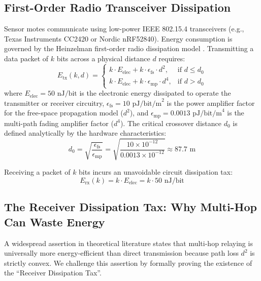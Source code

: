 \documentclass[journal]{IEEEtran}
\begin{document}
\subsection{First-Order Radio Transceiver Dissipation}
Sensor motes communicate using low-power IEEE 802.15.4 transceivers (e.g., Texas Instruments CC2420 or Nordic nRF52840). Energy consumption is governed by the Heinzelman first-order radio dissipation model \cite{heinzelman2000energy}. Transmitting a data packet of $k$ bits across a physical distance $d$ requires:
\begin{equation}
E_{\text{tx}}(k, d) = 
\begin{cases}
k \cdot E_{\text{elec}} + k \cdot \epsilon_{\text{fs}} \cdot d^2, & \text{if } d \le d_0 \\
k \cdot E_{\text{elec}} + k \cdot \epsilon_{\text{mp}} \cdot d^4, & \text{if } d > d_0
\end{cases}
\label{eq:etx}
\end{equation}
where $E_{\text{elec}} = 50\text{ nJ/bit}$ is the electronic energy dissipated to operate the transmitter or receiver circuitry, $\epsilon_{\text{fs}} = 10\text{ pJ/bit/m}^2$ is the power amplifier factor for the free-space propagation model ($d^2$), and $\epsilon_{\text{mp}} = 0.0013\text{ pJ/bit/m}^4$ is the multi-path fading amplifier factor ($d^4$). The critical crossover distance $d_0$ is defined analytically by the hardware characteristics:
\begin{equation}
d_0 = \sqrt{\frac{\epsilon_{\text{fs}}}{\epsilon_{\text{mp}}}} = \sqrt{\frac{10 \times 10^{-12}}{0.0013 \times 10^{-12}}} \approx 87.7\text{ m}
\label{eq:d0}
\end{equation}

Receiving a packet of $k$ bits incurs an unavoidable circuit dissipation tax:
\begin{equation}
E_{\text{rx}}(k) = k \cdot E_{\text{elec}} = k \cdot 50\text{ nJ/bit}
\label{eq:erx}
\end{equation}

\subsection{The Receiver Dissipation Tax: Why Multi-Hop Can Waste Energy}
A widespread assertion in theoretical literature states that multi-hop relaying is universally more energy-efficient than direct transmission because path loss $d^2$ is strictly convex. We challenge this assertion by formally proving the existence of the ``Receiver Dissipation Tax''.
\end{document}
